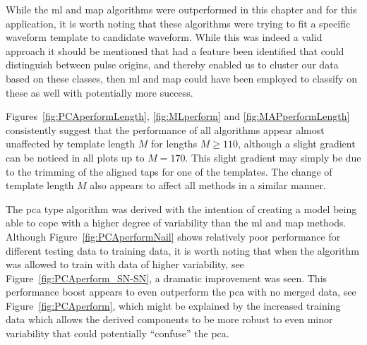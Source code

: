 \label{corrections:ML}While the \gls{ml} and \gls{map} algorithms were outperformed in this chapter and for this application, it is worth noting that these algorithms were trying to fit a specific waveform template to candidate waveform. While this was indeed a valid approach it should be mentioned that had a feature been identified that could distinguish between pulse origins, and thereby enabled us to cluster our data based on these classes, then \gls{ml} and \gls{map} could have been employed to classify on these as well with potentially more success.

Figures~\ref{fig:PCAperformLength}, \ref{fig:MLperform} and \ref{fig:MAPperformLength} consistently suggest that the performance of all algorithms appear almost unaffected by template length $M$ for lengths $M\geq110$, although a slight gradient can be noticed in all plots up to $M=170$. This slight gradient may simply be due to the trimming of the aligned taps for one of the templates. The change of template length $M$ also appears to affect all methods in a similar manner.

The \gls{pca} type algorithm was derived with the intention of creating a model being able to cope with a higher degree of variability than the \gls{ml} and \gls{map} methods. Although Figure~\ref{fig:PCAperformNail} shows relatively poor performance for different testing data to training data, it is worth noting that when the algorithm was allowed to train with data of higher variability, see Figure~\ref{fig:PCAperform_SN-SN}, a dramatic improvement was seen. This performance boost appears to even outperform the \gls{pca} with no merged data, see Figure~\ref{fig:PCAperform}, which might be explained by the increased training data which allows the derived components to be more robust to even minor variability that could potentially ``confuse'' the \gls{pca}.

